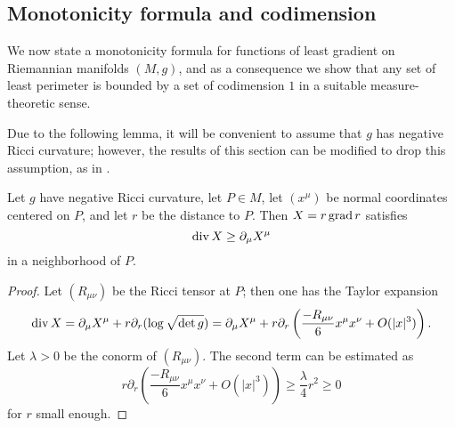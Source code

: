 
\subsection{Monotonicity formula and codimension}
We now state a monotonicity formula for functions of least gradient on Riemannian manifolds $(M, g)$, and as a consequence we show that any set of least perimeter is bounded by a set of codimension $1$ in a suitable measure-theoretic sense.

Due to the following lemma, it will be convenient to assume that $g$ has negative Ricci curvature; however, the results of this section can be modified to drop this assumption, as in \cite[Theorem 7.11]{MarquesXX}.

\begin{lemma}\label{divergence estimate}
Let $g$ have negative Ricci curvature, let $P \in M$, let $(x^\mu)$ be normal coordinates centered on $P$, and let $r$ be the distance to $P$. Then $X = r\operatorname{grad} r$ satisfies
$$\operatorname{div} X \geq \partial_\mu X^\mu$$
in a neighborhood of $P$.
\end{lemma}
\begin{proof}
Let $(R_{\mu\nu})$ be the Ricci tensor at $P$; then one has the Taylor expansion \cite[Lemma 3.4]{schoen1994lectures}
$$\operatorname{div} X = \partial_\mu X^\mu + r\partial_r(\log \sqrt{\det g}) = \partial_\mu X^\mu + r\partial_r\left(\frac{-R_{\mu\nu}}{6}x^\mu x^\nu + O(|x|^3)\right).$$
Let $\lambda > 0$ be the conorm of $(R_{\mu\nu})$. The second term can be estimated as
$$r\partial_r\left(\frac{-R_{\mu\nu}}{6}x^\mu x^\nu + O(|x|^3)\right) \geq \frac{\lambda}{4}r^2 \geq 0$$
for $r$ small enough.
\end{proof}

